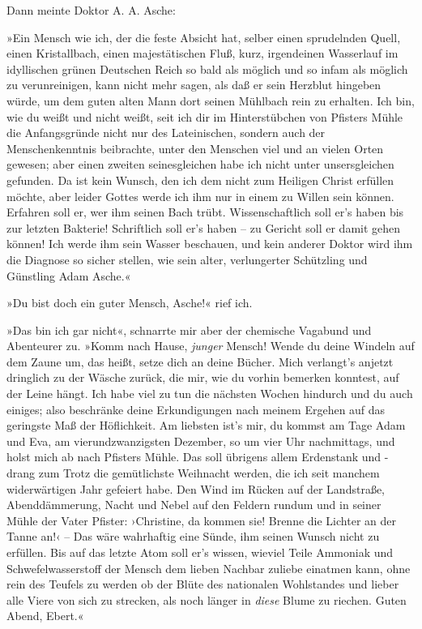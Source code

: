 Dann meinte Doktor A. A. Asche:

»Ein Mensch wie ich, der die feste Absicht hat, selber einen
sprudelnden Quell, einen Kristallbach, einen majestätischen Fluß,
kurz, irgendeinen Wasserlauf im idyllischen grünen Deutschen Reich
so bald als möglich und so infam als möglich zu verunreinigen, kann
nicht mehr sagen, als daß er sein Herzblut hingeben würde, um dem
guten alten Mann dort seinen Mühlbach rein zu erhalten. Ich bin,
wie du weißt und nicht weißt, seit ich dir im Hinterstübchen von
Pfisters Mühle die Anfangsgründe nicht nur des Lateinischen,
sondern auch der Menschenkenntnis beibrachte, unter den Menschen
viel und an vielen Orten gewesen; aber einen zweiten seinesgleichen
habe ich nicht unter unsersgleichen gefunden. Da ist kein Wunsch,
den ich dem nicht zum Heiligen Christ erfüllen möchte, aber leider
Gottes werde ich ihm nur in einem zu Willen sein können. Erfahren
soll er, wer ihm seinen Bach trübt. Wissenschaftlich soll er's
haben bis zur letzten Bakterie! Schriftlich soll er's haben – zu
Gericht soll er damit gehen können! Ich werde ihm sein Wasser
beschauen, und kein anderer Doktor wird ihm die Diagnose so sicher
stellen, wie sein alter, verlungerter Schützling und Günstling Adam
Asche.«

»Du bist doch ein guter Mensch, Asche!« rief ich.

»Das bin ich gar nicht«, schnarrte mir aber der chemische Vagabund
und Abenteurer zu. »Komm nach Hause, \emph{junger} Mensch! Wende du
deine Windeln auf dem Zaune um, das heißt, setze dich an deine
Bücher. Mich verlangt's anjetzt dringlich zu der Wäsche zurück, die
mir, wie du vorhin bemerken konntest, auf der Leine hängt. Ich habe
viel zu tun die nächsten Wochen hindurch und du auch einiges; also
beschränke deine Erkundigungen nach meinem Ergehen auf das
geringste Maß der Höflichkeit. Am liebsten ist's mir, du kommst am
Tage Adam und Eva, am vierundzwanzigsten Dezember, so um vier Uhr
nachmittags, und holst mich ab nach Pfisters Mühle. Das soll
übrigens allem Erdenstank und -drang zum Trotz die gemütlichste
Weihnacht werden, die ich seit manchem widerwärtigen Jahr gefeiert
habe. Den Wind im Rücken auf der Landstraße, Abenddämmerung, Nacht
und Nebel auf den Feldern rundum und in seiner Mühle der Vater
Pfister: ›Christine, da kommen sie! Brenne die Lichter an der Tanne
an!‹ – Das wäre wahrhaftig eine Sünde, ihm seinen Wunsch nicht zu
erfüllen. Bis auf das letzte Atom soll er's wissen, wieviel Teile
Ammoniak und Schwefelwasserstoff der Mensch dem lieben Nachbar
zuliebe einatmen kann, ohne rein des Teufels zu werden ob der Blüte
des nationalen Wohlstandes und lieber alle Viere von sich zu
strecken, als noch länger in \emph{diese} Blume zu riechen. Guten
Abend, Ebert.«

